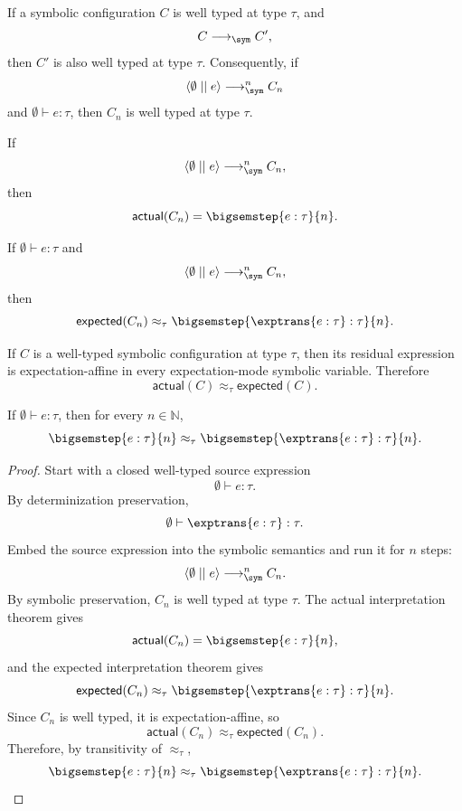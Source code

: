 \begin{lemma}
  If a symbolic configuration \(C\) is well typed at type \(\tau\), and
  \[
    C \longrightarrow_{\sym} C',
  \]
  then \(C'\) is also well typed at type \(\tau\).  Consequently, if
  \[
    \langle \emptyset \mid\mid e \rangle
    \longrightarrow_{\sym}^{n}
    C_n
  \]
  and \(\emptyset \vdash e : \tau\), then \(C_n\) is well typed at type
  \(\tau\).
\end{lemma}

\begin{lemma}
  If
  \[
    \langle \emptyset \mid\mid e \rangle
    \longrightarrow_{\sym}^{n}
    C_n,
  \]
  then
  \[
    \mathsf{actual}(C_n) = \bigsemstep{e : \tau}{n}.
  \]
\end{lemma}

\begin{lemma}
  If \(\emptyset \vdash e : \tau\) and
  \[
    \langle \emptyset \mid\mid e \rangle
    \longrightarrow_{\sym}^{n}
    C_n,
  \]
  then
  \[
    \mathsf{expected}(C_n)
    \approx_\tau
    \bigsemstep{\exptrans{e : \tau} : \tau}{n}.
  \]
\end{lemma}

\begin{lemma}
  If \(C\) is a well-typed symbolic configuration at type \(\tau\), then its
  residual expression is expectation-affine in every expectation-mode symbolic
  variable.  Therefore
  \[
    \mathsf{actual}(C) \approx_\tau \mathsf{expected}(C).
  \]
\end{lemma}

\begin{theorem}
  If \(\emptyset \vdash e : \tau\), then for every \(n \in \mathbb{N}\),
  \[
    \bigsemstep{e : \tau}{n}
    \approx_\tau
    \bigsemstep{\exptrans{e : \tau} : \tau}{n}.
  \]
\end{theorem}

\begin{proof}
  Start with a closed well-typed source expression
  \[
    \emptyset \vdash e : \tau.
  \]
  By determinization preservation,
  \[
    \emptyset \vdash \exptrans{e : \tau} : \tau.
  \]
  Embed the source expression into the symbolic semantics and run it for
  \(n\) steps:
  \[
    \langle \emptyset \mid\mid e \rangle
    \longrightarrow_{\sym}^{n}
    C_n.
  \]
  By symbolic preservation, \(C_n\) is well typed at type \(\tau\).  The actual
  interpretation theorem gives
  \[
    \mathsf{actual}(C_n) = \bigsemstep{e : \tau}{n},
  \]
  and the expected interpretation theorem gives
  \[
    \mathsf{expected}(C_n)
    \approx_\tau
    \bigsemstep{\exptrans{e : \tau} : \tau}{n}.
  \]
  Since \(C_n\) is well typed, it is expectation-affine, so
  \[
    \mathsf{actual}(C_n) \approx_\tau \mathsf{expected}(C_n).
  \]
  Therefore, by transitivity of \(\approx_\tau\),
  \[
    \bigsemstep{e : \tau}{n}
    \approx_\tau
    \bigsemstep{\exptrans{e : \tau} : \tau}{n}.
  \]
\end{proof}


